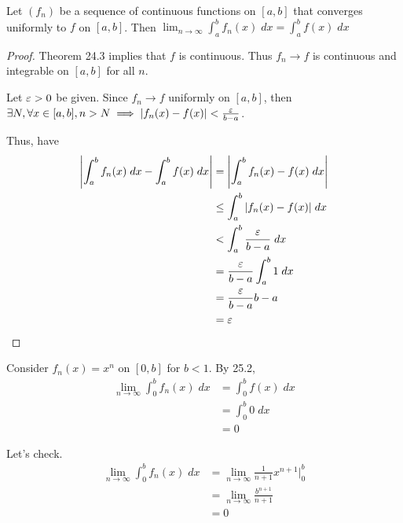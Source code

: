 \documentclass{article}
\begin{document}
\begin{cthm}[Theorem 25.2]
  Let $(f_n)$ be a sequence of continuous functions on $[a, b]$ that converges uniformly to $f$ on $[a, b]$. Then $\lim_{n\to\infty} \int_a^b f_n(x) \; dx = \int_a^b f(x) \; dx$
\end{cthm}
\begin{proof}
  Theorem 24.3 implies that $f$ is continuous. Thus $f_n \to f$ is continuous and integrable on $[a, b]$ for all $n$.

  Let $\varepsilon > 0$ be given. Since $f_n \to f$ uniformly on $[a, b]$, then $\exists N, \forall x \in [a, b], n > N \implies \abs{f_n(x) - f(x)} < \frac{\varepsilon}{b-a}$.

  Thus, have
  \begin{align*}
    \abs{\int_a^b f_n(x) \; dx - \int_a^b f(x) \; dx} &= \abs{\int_a^b f_n(x) - f(x) \; dx}\\
    &\leq \int_a^b \abs{f_n(x) - f(x)} \; dx\\
    &< \int_a^b \frac{\varepsilon}{b-a} \; dx\\
    &= \frac{\varepsilon}{b-a} \int_a^b 1 \; dx\\
    &= \frac{\varepsilon}{b-a}b-a\\
    &= \varepsilon
  \end{align*}
\end{proof}
\begin{example}
  Consider $f_n(x) = x^n$ on $[0, b]$ for $b < 1$. By 25.2,
  \begin{align*}
    \lim_{n\to\infty} \int_0^b f_n(x) \; dx &= \int_0^b f(x) \; dx\\
    &= \int_0^b 0 \; dx\\
    &= 0
  \end{align*}

  Let's check.
  \begin{align*}
    \lim_{n\to\infty} \int_0^b f_n(x) \; dx &= \lim_{n\to\infty} \frac{1}{n+1} x^{n+1}\Big|_0^b\\
    &= \lim_{n\to\infty} \frac{b^{n+1}}{n+1}\\
    &= 0 \tag{$0 < b < 1$}
  \end{align*}
\end{example}
\end{document}
